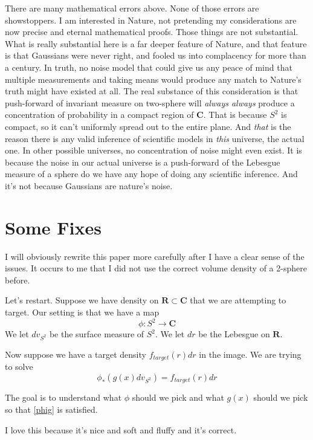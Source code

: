 \documentclass{amsart}
\begin{document}
There are many mathematical errors above.  None of those errors are showstoppers.  I am interested in Nature, not pretending my considerations are now precise and eternal mathematical proofs.  Those things are not substantial.  What is really substantial here is a far deeper feature of Nature, and that feature is that Gaussians were never right, and fooled us into complacency for more than a century.  In truth, no noise model that could give us any peace of mind that multiple measurements and taking means would produce any match to Nature's truth might have existed at all.  The real substance of this consideration is that push-forward of invariant measure on two-sphere will {\em always always} produce a concentration of probability in a compact region of $\mathbf{C}$.  That is because $S^2$ is compact, so it can't uniformly spread out to the entire plane.  And {\em that} is the reason there is any valid inference of scientific models in {\em this} universe, the actual one.  In other possible universes, no concentration of noise might even exist.  It is because the noise in our actual universe is a push-forward of the Lebesgue measure of a sphere do we have any hope of doing any scientific inference.  And it's not because Gaussians are nature's noise.  

\section{Some Fixes}

I will obviously rewrite this paper more carefully after I have a clear sense of the issues.  It occurs to me that I did not use the correct volume density of a 2-sphere before.

Let's restart.  Suppose we have density on $\mathbf{R} \subset \mathbf{C}$ that we are attempting to target.  Our setting is that we have a map 
\[
\phi: S^2 \rightarrow \mathbf{C}
\]
We let $dv_{S^2}$ be the surface measure of $S^2$.  We let $dr$ be the Lebesgue on $\mathbf{R}$.

Now suppose we have a target density $f_{target}(r) dr$ in the image.  We are trying to solve
\begin{equation}
\label{phig}
\phi_*( g(x) dv_{S^2} ) = f_{target}(r) dr
\end{equation}

The goal is to understand what $\phi$ should we pick and what $g(x)$ should we pick so that \eqref{phig} is satisfied.

I love this because it's nice and soft and fluffy and it's correct.  
\end{document}
